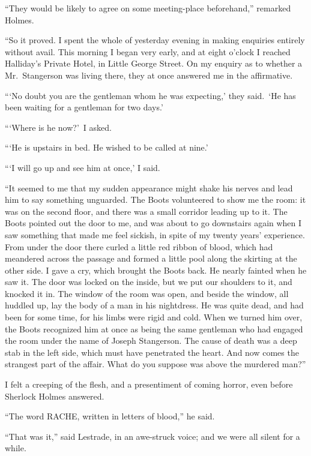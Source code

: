\documentclass[12pt,english]{book}
\begin{document}
{}``They would be likely to agree on some meeting-place beforehand,''
remarked Holmes.

{}``So it proved. I spent the whole of yesterday evening in making
enquiries entirely without avail. This morning I began very early,
and at eight o'clock I reached Halliday's Private Hotel, in Little
George Street. On my enquiry as to whether a Mr.\ Stangerson was
living there, they at once answered me in the affirmative.

{}```No doubt you are the gentleman whom he was expecting,' they
said.\  `He has been waiting for a gentleman for two days.'

{}```Where is he now?'\ I asked.

{}```He is upstairs in bed. He wished to be called at nine.'

{}```I will go up and see him at once,' I said.

{}``It seemed to me that my sudden appearance might shake his nerves
and lead him to say something unguarded. The Boots volunteered to
show me the room: it was on the second floor, and there was a small
corridor leading up to it. The Boots pointed out the door to me, and
was about to go downstairs again when I saw something that made me
feel sickish, in spite of my twenty years' experience. From under
the door there curled a little red ribbon of blood, which had meandered
across the passage and formed a little pool along the skirting at
the other side. I gave a cry, which brought the Boots back. He nearly
fainted when he saw it. The door was locked on the inside, but we
put our shoulders to it, and knocked it in. The window of the room
was open, and beside the window, all huddled up, lay the body of a
man in his nightdress. He was quite dead, and had been for some time,
for his limbs were rigid and cold. When we turned him over, the Boots
recognized him at once as being the same gentleman who had engaged
the room under the name of Joseph Stangerson. The cause of death was
a deep stab in the left side, which must have penetrated the heart.
And now comes the strangest part of the affair. What do you suppose
was above the murdered man?''

I felt a creeping of the flesh, and a presentiment of coming horror,
even before Sherlock Holmes answered.

{}``The word RACHE, written in letters of blood,'' he said.

{}``That was it,'' said Lestrade, in an awe-struck voice; and we
were all silent for a while.
\end{document}
